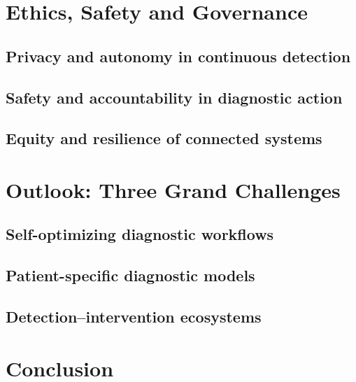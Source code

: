 \documentclass[12pt,a4paper]{article}
\newif\ifshowplaceholders
\newcommand{\outlineplaceholder}{%
\ifshowplaceholders
\par\noindent\textit{[Content to be developed.]}\par\medskip
\fi
}
\begin{document}
\section{Ethics, Safety and Governance}
\label{sec:ethics_safety_governance}

\subsection{Privacy and autonomy in continuous detection}
\label{subsec:privacy_autonomy}
\outlineplaceholder

\subsection{Safety and accountability in diagnostic action}
\label{subsec:safety_accountability}
\outlineplaceholder

\subsection{Equity and resilience of connected systems}
\label{subsec:equity_resilience}
\outlineplaceholder


\section{Outlook: Three Grand Challenges}
\label{sec:future_outlook}

\subsection{Self-optimizing diagnostic workflows}
\label{subsec:self_optimizing_diagnostic_workflows}

\subsection{Patient-specific diagnostic models}
\label{subsec:patient_specific_embodied_models}

\subsection{Detection--intervention ecosystems}
\label{subsec:closed_loop_detection_intervention}


\section{Conclusion}
\label{sec:conclusion}
\outlineplaceholder
\end{document}
